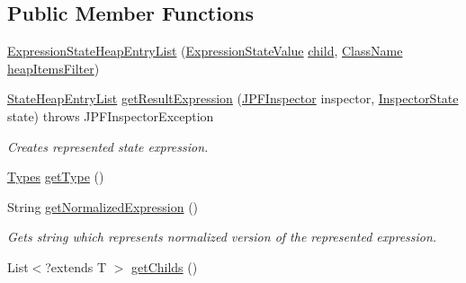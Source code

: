 \subsection*{Public Member Functions}
\begin{DoxyCompactItemize}
\item 
\hyperlink{classgov_1_1nasa_1_1jpf_1_1inspector_1_1server_1_1expression_1_1expressions_1_1_expression_state_heap_entry_list_a87a81286ae7a70616eaccf32f78fffe1}{Expression\+State\+Heap\+Entry\+List} (\hyperlink{classgov_1_1nasa_1_1jpf_1_1inspector_1_1server_1_1expression_1_1expressions_1_1_expression_state_value}{Expression\+State\+Value} \hyperlink{classgov_1_1nasa_1_1jpf_1_1inspector_1_1server_1_1expression_1_1_expression_state_unary_operator_a66041b1f569a361549e28a00f7ca5f2f}{child}, \hyperlink{classgov_1_1nasa_1_1jpf_1_1inspector_1_1utils_1_1expressions_1_1_class_name}{Class\+Name} \hyperlink{classgov_1_1nasa_1_1jpf_1_1inspector_1_1server_1_1expression_1_1expressions_1_1_expression_state_heap_entry_list_a6c9bd3b9580253d35d991a00a8a5c2e8}{heap\+Items\+Filter})
\item 
\hyperlink{classgov_1_1nasa_1_1jpf_1_1inspector_1_1server_1_1programstate_1_1_state_heap_entry_list}{State\+Heap\+Entry\+List} \hyperlink{classgov_1_1nasa_1_1jpf_1_1inspector_1_1server_1_1expression_1_1expressions_1_1_expression_state_heap_entry_list_a1122f898fc0ef3bbe43f3c278a130052}{get\+Result\+Expression} (\hyperlink{classgov_1_1nasa_1_1jpf_1_1inspector_1_1server_1_1jpf_1_1_j_p_f_inspector}{J\+P\+F\+Inspector} inspector, \hyperlink{interfacegov_1_1nasa_1_1jpf_1_1inspector_1_1server_1_1expression_1_1_inspector_state}{Inspector\+State} state)  throws J\+P\+F\+Inspector\+Exception 
\begin{DoxyCompactList}\small\item\em Creates represented state expression. \end{DoxyCompactList}\item 
\hyperlink{enumgov_1_1nasa_1_1jpf_1_1inspector_1_1server_1_1expression_1_1_types}{Types} \hyperlink{classgov_1_1nasa_1_1jpf_1_1inspector_1_1server_1_1expression_1_1expressions_1_1_expression_state_heap_entry_list_a5efd10236fbad8f0ef1c2d60f2a746c6}{get\+Type} ()
\item 
String \hyperlink{classgov_1_1nasa_1_1jpf_1_1inspector_1_1server_1_1expression_1_1expressions_1_1_expression_state_heap_entry_list_a177111768101430f6943fe04956579ca}{get\+Normalized\+Expression} ()
\begin{DoxyCompactList}\small\item\em Gets string which represents normalized version of the represented expression. \end{DoxyCompactList}\item 
List$<$?extends T $>$ \hyperlink{classgov_1_1nasa_1_1jpf_1_1inspector_1_1server_1_1expression_1_1_expression_state_unary_operator_ad010bcb9c4e2eb584321b5ceba8e1682}{get\+Childs} ()
\end{DoxyCompactItemize}
